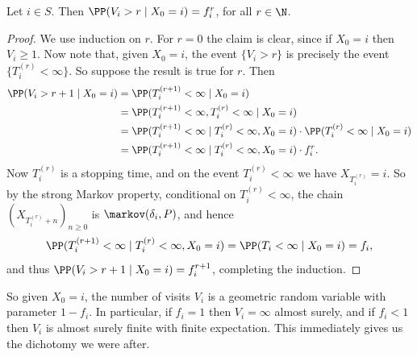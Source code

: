 \begin{lemma}
	Let $i \in S$. Then $\PP(V_i > r \mid X_0 = i) = f_i^r$, for all $r \in \N$.
\end{lemma}
\begin{proof}
	We use induction on $r$. For $r = 0$ the claim is clear, since if $X_0 = i$ then $V_i \geq 1$. Now note that, given $X_0 = i$, the event $\{V_i > r\}$ is precisely the event $\{T_i^{(r)} < \infty\}$. So suppose the result is true for $r$. Then
	\begin{align*}
		\PP(V_i > r + 1 \mid X_0 = i) &= \PP(T_i^{(r + 1)} < \infty \mid X_0 = i) \\
		&= \PP(T_i^{(r + 1)} < \infty, T_i^{(r)} < \infty \mid X_0 = i) \\
		&= \PP(T_i^{(r + 1)} < \infty \mid T_i^{(r)} < \infty, X_0 = i) \cdot \PP(T_i^{(r)} < \infty \mid X_0 = i) \\
		&= \PP(T_i^{(r + 1)} < \infty \mid T_i^{(r)} < \infty, X_0 = i) \cdot f_i^r.
	\end{align*}
	Now $T_i^{(r)}$ is a stopping time, and on the event $T_i^{(r)} < \infty$ we have $X_{T_i^{(r)}} = i$. So by the strong Markov property, conditional on $T_i^{(r)} < \infty$, the chain $(X_{T_i^{(r)} + n})_{n \geq 0}$ is $\markov(\delta_i, P)$, and hence
	$$
	\PP(T_i^{(r + 1)} < \infty \mid T_i^{(r)} < \infty, X_0 = i) = \PP(T_i < \infty \mid X_0 = i) = f_i,
	$$
	and thus $\PP(V_i > r + 1 \mid X_0 = i) = f_i^{r + 1}$, completing the induction.
\end{proof}

So given $X_0 = i$, the number of visits $V_i$ is a geometric random variable with parameter $1 - f_i$. In particular, if $f_i = 1$ then $V_i = \infty$ almost surely, and if $f_i < 1$ then $V_i$ is almost surely finite with finite expectation. This immediately gives us the dichotomy we were after.

